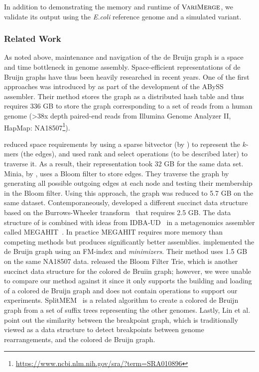 In addition to demonstrating the memory and runtime of $\mbox{\rm {\sc VariMerge}}$, we validate its output using the \emph{E.coli} reference genome and a simulated variant.


\subsubsection{Related Work}
As noted above, maintenance and navigation of the de Bruijn graph is a space and time bottleneck in genome assembly. Space-efficient representations of de Bruijn graphs have thus been heavily researched in recent years. One of the first approaches was introduced by \cite{Simpson:2009} as part of the development of the ABySS assembler.  Their method stores the graph as a distributed hash table and thus requires 336 GB to store the graph corresponding to a set of reads from a human genome (>38x depth paired-end reads from Illumina Genome Analyzer II, HapMap: NA18507\footnote{\url{https://www.ncbi.nlm.nih.gov/sra/?term=SRA010896}}).

\cite{conway} reduced space requirements by using a sparse bitvector  (by \cite{bitvector}) to represent the $k$-mers (the edges), and used rank and select operations (to be described later) to traverse it. As a result, their representation took 32 GB for the same data set.  Minia, by \cite{wabi}, uses a Bloom filter to store edges. They traverse the graph by generating all possible outgoing edges at each node and testing their membership in the Bloom filter. Using this approach, the graph was reduced to 5.7 GB on the same dataset.  Contemporaneously, \cite{BOSS12} developed a different succinct data structure based on the Burrows-Wheeler transform~\citep{BW94} that requires 2.5 GB.  The data structure of \cite{BOSS12} is combined with ideas from IDBA-UD~\citep{idbaud} in a metagenomics assembler called MEGAHIT~\citep{megahit}.  In practice MEGAHIT requires more memory than competing methods  but produces significantly better assemblies.   \cite{paul} implemented the de Bruijn graph using an FM-index and \emph{minimizers}.   Their method uses 1.5 GB on the same NA18507 data.  \cite{BFT} released the Bloom Filter Trie, which is another succinct data structure for the colored de Bruiin graph; however, we were unable to compare our method against it since  it only supports the building and loading of a colored de Bruijn graph and does not contain operations to support our experiments.  SplitMEM~\citep{splitmem} is a related algorithm to create a colored de Bruijn graph from a set of suffix trees representing the other genomes. Lastly, Lin et al. \citep{Lin} point out the similarity between the breakpoint graph, which is traditionally viewed as a data structure to detect breakpoints between genome rearrangements, and the colored de Bruijn graph.



